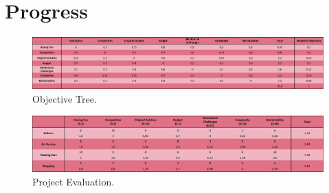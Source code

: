 \documentclass[a4paper,12pt]{article}
\begin{document}
\section{Progress}
	\begin{figure}[b!]
	\centering
	\setlength{\unitlength}{\textwidth} 
	\includegraphics[width=\textwidth,height=\textheight,keepaspectratio]{objective_tree}
	\caption{\label{fig:objective-tree} Objective Tree.}
\end{figure}
\begin{figure}[b!]
	\centering
	\setlength{\unitlength}{\textwidth} 
	\includegraphics[width=\textwidth,height=\textheight,keepaspectratio]{project_evaluation}
	\caption{\label{fig:project-evaluation} Project Evaluation.}
\end{figure}
\end{document}
